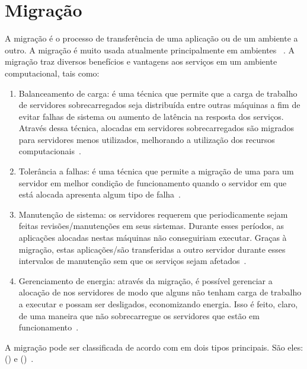 \section{Migração}
A migração é o processo de transferência de uma aplicação ou \vm de um ambiente a outro. A migração é muito usada atualmente principalmente em ambientes \cloud~\cite{imran2022live}. A migração traz diversos benefícios e vantagens aos serviços em um ambiente computacional, tais como:
\begin{enumerate}[label=(\roman*)]
    \item Balanceamento de carga: é uma técnica que permite que a carga de trabalho de servidores sobrecarregados seja distribuída entre outras máquinas a fim de evitar falhas de sistema ou aumento de latência na resposta dos serviços. Através dessa técnica, \vms alocadas em servidores sobrecarregados são migrados para servidores menos utilizados, melhorando a utilização dos recursos computacionais~\cite{wood2007black}.
    \item Tolerância a falhas: é uma técnica que permite a migração de uma \vm para um servidor em melhor condição de funcionamento quando o servidor em que está alocada apresenta algum tipo de falha~\cite{nagarajan2007proactive}.
    \item Manutenção de sistema: os servidores requerem que periodicamente sejam feitas revisões/manutenções em seus sistemas. Durante esses períodos, as aplicações alocadas nestas máquinas não conseguiriam executar. Graças à migração, estas aplicações/\vms são transferidas a outro servidor durante esses intervalos de manutenção sem que os serviços sejam afetados~\cite{devi2011security}.
    \item Gerenciamento de energia: através da migração, é possível gerenciar a alocação de \vms nos servidores de modo que alguns não tenham carga de trabalho a executar e possam ser desligados, economizando energia. Isso é feito, claro, de uma maneira que não sobrecarregue os servidores que estão em funcionamento~\cite{hu2008magnet}.
\end{enumerate}

A migração pode ser classificada de acordo com em dois tipos principais. São eles: \coldmigration(\nonlivemigration) e \hotmigration (\livemigration)~\cite{imran2022live}.

